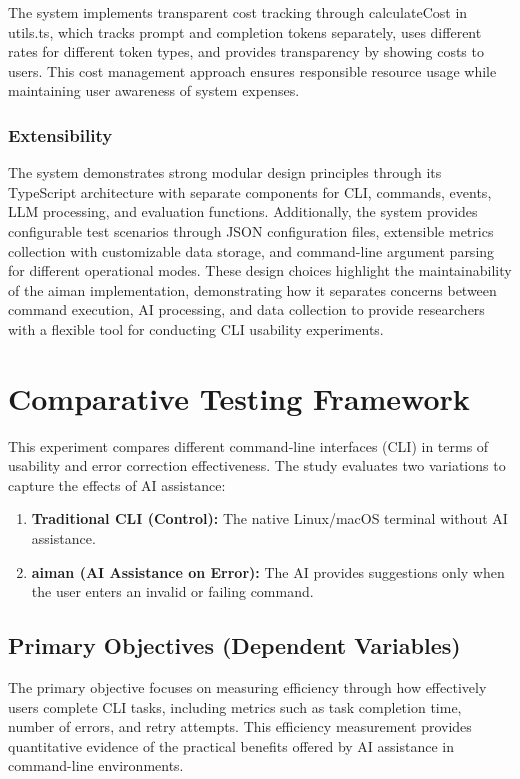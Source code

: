 The system implements transparent cost tracking through calculateCost in utils.ts, which tracks prompt and completion tokens separately, uses different rates for different token types, and provides transparency by showing costs to users. This cost management approach ensures responsible resource usage while maintaining user awareness of system expenses.

\subsubsection{Extensibility}

The system demonstrates strong modular design principles through its TypeScript architecture with separate components for CLI, commands, events, LLM processing, and evaluation functions. Additionally, the system provides configurable test scenarios through JSON configuration files, extensible metrics collection with customizable data storage, and command-line argument parsing for different operational modes. These design choices highlight the maintainability of the aiman implementation, demonstrating how it separates concerns between command execution, AI processing, and data collection to provide researchers with a flexible tool for conducting CLI usability experiments.

\section{Comparative Testing Framework}

This experiment compares different command-line interfaces (CLI) in terms of usability and error correction effectiveness. The study evaluates two variations to capture the effects of AI assistance:

\begin{enumerate}
	\item \textbf{Traditional CLI (Control):} The native Linux/macOS terminal without AI assistance.
	\item \textbf{aiman (AI Assistance on Error):} The AI provides suggestions only when the user enters an invalid or failing command.
\end{enumerate}

\subsection{Primary Objectives (Dependent Variables)}

The primary objective focuses on measuring efficiency through how effectively users complete CLI tasks, including metrics such as task completion time, number of errors, and retry attempts. This efficiency measurement provides quantitative evidence of the practical benefits offered by AI assistance in command-line environments.

